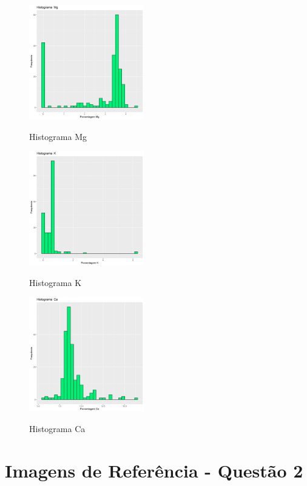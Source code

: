 \documentclass[conference]{IEEEtran}
\begin{document}
\begin{figure}[h]
\caption{Histograma Mg}
\centering %
\includegraphics[width=5cm]{images/pt1/HistogramaMg.png} %
\label{figura:histogramaal}
\end{figure}



\begin{figure}[h]
\caption{Histograma K}
\centering %
\includegraphics[width=5cm]{images/pt1/HistogramaK.png} %
\label{figura:histogramaal}
\end{figure}



\begin{figure}[h]
\caption{Histograma Ca}
\centering %
\includegraphics[width=5cm]{images/pt1/HistogramaCa.png} %
\label{figura:histogramaal}
\end{figure}


\newpage %
\section{Imagens de Referência - Questão 2}
\end{document}
